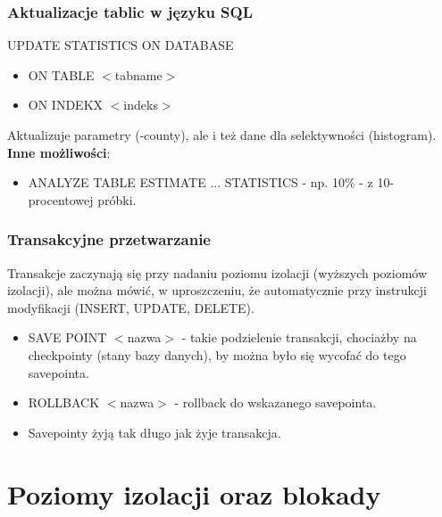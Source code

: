 \documentclass[a4paper,twoside]{article}
\begin{document}
  	\section*{Aktualizacje tablic w języku SQL} \noindent
  	UPDATE STATISTICS ON DATABASE
  	\begin{itemize}
  		\item ON TABLE $ < $tabname$ > $
  		\item ON INDEKX $ < $indeks$ > $
  	\end{itemize}
  	Aktualizuje parametry (-county), ale i też dane dla selektywności (histogram).\\
  	\textbf{Inne możliwości}:
  	\begin{itemize}
  		\item ANALYZE TABLE ESTIMATE ... STATISTICS - np. 10\% - z 10-procentowej próbki.
  	\end{itemize}
  	
	\section*{Transakcyjne przetwarzanie} \noindent
	Transakcje zaczynają się przy nadaniu poziomu izolacji (wyższych poziomów izolacji), ale można mówić, w uproszczeniu, że automatycznie przy instrukcji modyfikacji (INSERT, UPDATE, DELETE).
	\begin{itemize}
		\item SAVE POINT $ < $nazwa$ > $ - takie podzielenie transakcji, chociażby na checkpointy (stany bazy danych), by można było się wycofać do tego savepointa.
		\item ROLLBACK $ < $nazwa$ > $ - rollback do wskazanego savepointa.
		\item Savepointy żyją tak długo jak żyje transakcja.
	\end{itemize}
  	
  	\part*{Poziomy izolacji oraz blokady}
  	
\end{document}
